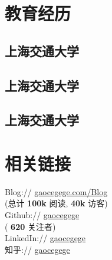 \documentclass[]{deedy-resume-openfont}
\begin{document}
%
%
\lastupdated


%
%

\begin{minipage}[t]{0.3\textwidth}


\section{教育经历}
\sectionsep

\subsection{上海交通大学}
\sectionsep

\subsection{上海交通大学}
\sectionsep

\subsection{上海交通大学}
\sectionsep


\section{相关链接}
\sectionsep
Blog://  \href{http://gaocegege.com/Blog}{gaocegege.com/Blog} \\
{(总计\textbf{ 100k }阅读,\textbf{ 40k }访客)} \\
Github:// \href{https://github.com/gaocegege}{gaocegege} \\
{(\textbf{ 620 }关注者)} \\
LinkedIn://  \href{https://www.linkedin.com/in/gaocegege}{gaocegege} \\
知乎:// \href{https://www.zhihu.com/people/gaocegege}{gaocegege} \\
\sectionsep


\end{minipage}
\end{document}
